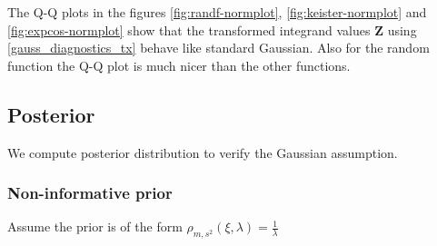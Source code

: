 \documentclass{svjour3}                     %
\newcommand{\bm}[1]{\boldsymbol{#1}}
\newcommand{\vZ}{\bm{Z}}
\begin{document}
The Q-Q plots in the figures \ref{fig:randf-normplot}, \ref{fig:keister-normplot} and \ref{fig:expcos-normplot} show that the transformed integrand values $\vZ$ using \eqref{gauss_diagnostics_tx} behave like standard Gaussian.
Also for the random function the Q-Q plot is much nicer than the other functions.

\iffalse


\subsection{Posterior} We compute posterior distribution to verify the Gaussian assumption.

\subsubsection{Non-informative prior}
Assume the prior is of the form $ \rho_{m,s^2} (\xi, \lambda) = \frac{1}{\lambda} $ 
\end{document}

